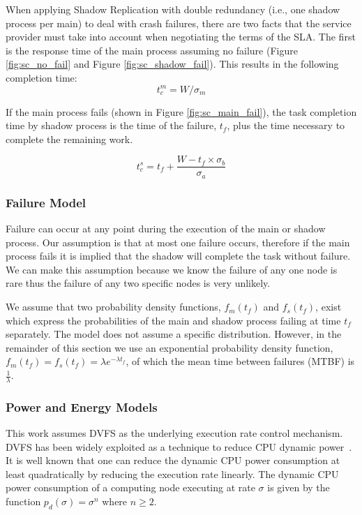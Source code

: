 When applying Shadow Replication with double redundancy (i.e., one shadow process per main) to deal with crash failures, 
there are two facts that the service provider must take into account
when negotiating the terms of the SLA. The first is the response time
of the main process assuming no failure (Figure
\ref{fig:sc_no_fail} and Figure \ref{fig:sc_shadow_fail}). This
results in the following completion time:
\begin{equation}
t_c^m=W/\sigma_m
\label{eq:tcm}
\end{equation}

If the main process fails (shown in Figure \ref{fig:sc_main_fail}), the
task completion time by shadow process is the time of the failure,
$t_f$, plus the time necessary to complete the remaining work.

\begin{equation}
t_c^s=t_f+\frac{W-t_f \times \sigma_b}{\sigma_a}
\label{eq:tcs}
\end{equation}

\subsubsection{Failure Model}
Failure can occur at any point during the execution of the main or
shadow process. Our assumption is that at most one failure occurs,
therefore if the main process fails it is implied that the shadow will
complete the task without failure. We can make this assumption because
we know the failure of any one node is rare thus the failure
of any two specific nodes is very unlikely.

We assume that two probability density functions, $f_m(t_f)$ and
$f_s(t_f)$, exist which express the probabilities of the main and shadow
process failing at time $t_f$ separately. The model does not assume a
specific distribution. However, in the remainder of this section we use
an exponential probability density function, $f_m(t_f)=f_s(t_f)=\lambda
e^{-\lambda t_f}$, of which the mean time between failures (MTBF) is $\frac{1}{\lambda}$.

\subsubsection{Power and Energy Models}
This work assumes DVFS as the underlying execution rate control mechanism. 
DVFS has been widely exploited as a technique to reduce CPU dynamic power~\cite{pillai2001real,flautner2001automatic}. It
is well known that one can reduce the dynamic CPU power consumption at
least quadratically by reducing the execution rate linearly. The
dynamic CPU power consumption of a computing node executing at rate
$\sigma$ is given by the function $p_d(\sigma)=\sigma^n$ where $n \ge 2$.


